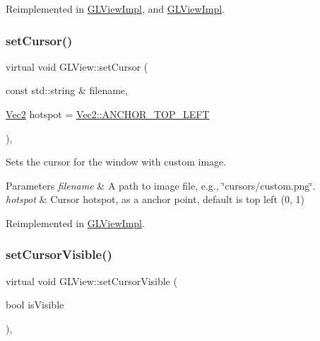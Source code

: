 Reimplemented in \hyperlink{classGLViewImpl_ae5fc53c9751b15efc4a6a1bc12db262c}{G\+L\+View\+Impl}, and \hyperlink{classGLViewImpl_a7bd1df076bd10554cc6aff25f2b07238}{G\+L\+View\+Impl}.

\mbox{\label{classGLView_ab9defa8d2bbfb495da622958e2f9a500}} 
\subsubsection{\texorpdfstring{set\+Cursor()}{setCursor()}}
{\footnotesize\ttfamily virtual void G\+L\+View\+::set\+Cursor (\begin{DoxyParamCaption}\item[{const std\+::string \&}]{filename,  }\item[{\hyperlink{classVec2}{Vec2}}]{hotspot = {\ttfamily \hyperlink{classVec2_ab0533215e446e0381d01bf49edd7ab7c}{Vec2\+::\+A\+N\+C\+H\+O\+R\+\_\+\+T\+O\+P\+\_\+\+L\+E\+FT}} }\end{DoxyParamCaption})\hspace{0.3cm}{\ttfamily [inline]}, {\ttfamily [virtual]}}

Sets the cursor for the window with custom image.


\begin{DoxyParams}{Parameters}
{\em filename} & A path to image file, e.\+g., \char`\"{}cursors/custom.\+png\char`\"{}. \\
\hline
{\em hotspot} & Cursor hotspot, as a anchor point, default is top left (0, 1) \\
\hline
\end{DoxyParams}


Reimplemented in \hyperlink{classGLViewImpl_a80189f01cb7314cd79fb37ccc5a1d779}{G\+L\+View\+Impl}.

\mbox{\label{classGLView_a1d09cf734d01c1a789ded4caef734b2a}} 
\subsubsection{\texorpdfstring{set\+Cursor\+Visible()}{setCursorVisible()}\hspace{0.1cm}{\footnotesize\ttfamily [1/2]}}
{\footnotesize\ttfamily virtual void G\+L\+View\+::set\+Cursor\+Visible (\begin{DoxyParamCaption}\item[{bool}]{is\+Visible }\end{DoxyParamCaption})\hspace{0.3cm}{\ttfamily [inline]}, {\ttfamily [virtual]}}

